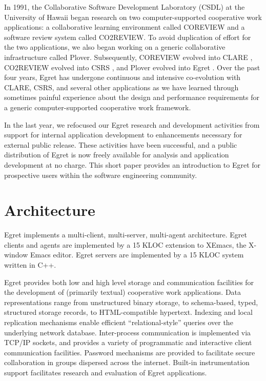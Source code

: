 In 1991, the Collaborative Software Development Laboratory (CSDL) at the
University of Hawaii began research on two computer-supported cooperative
work applications: a collaborative learning environment called COREVIEW and
a software review system called CO2REVIEW.  To avoid duplication of effort
for the two applications, we also began working on a generic collaborative
infrastructure called Plover.  Subsequently, COREVIEW evolved into CLARE
\cite{csdl-94-04}, CO2\-REVIEW evolved into CSRS \cite{csdl-93-17}, and
Plover evolved into Egret \cite{csdl-93-09}.  Over the past four years,
Egret has undergone continuous and intensive co-evolution with CLARE, CSRS,
and several other applications as we have learned through sometimes painful
experience about the design and performance requirements for a generic
computer-supported cooperative work framework.

In the last year, we refocused our Egret research and development
activities from support for internal application development to
enhancements necessary for external public release. These activities have
been successful, and a public distribution of Egret is now freely available
for analysis and application development at no charge.  This short paper
provides an introduction to Egret for prospective users within the 
software engineering
community.


\section{Architecture}

Egret implements a multi-client, multi-server, multi-agent architecture.
Egret clients and agents are implemented by a 15 KLOC extension to XEmacs,
the X-window Emacs editor. Egret servers are implemented by a 15 KLOC
system written in C++.   

Egret provides both low and high level storage and communication facilities
for the development of (primarily textual) cooperative work applications.
Data representations range from unstructured binary storage, to
schema-based, typed, structured storage records, to HTML-compatible
hypertext. Indexing and local replication mechanisms enable efficient
``relational-style'' queries over the underlying network database.
Inter-process communication is implemented via TCP/IP sockets, and provides
a variety of programmatic and interactive client communication facilities.
Password mechanisms are provided to facilitate secure collaboration in
groups dispersed across the internet. Built-in instrumentation support
facilitates research and evaluation of Egret applications.


